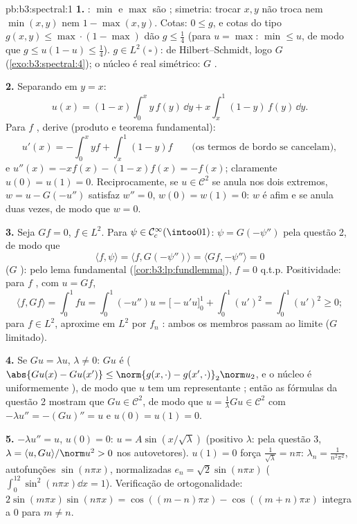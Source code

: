 \begin{solution}{pb:b3:spectral:1}
\textbf{1.} : $\min$ e $\max$ são ;
simetria: trocar $x, y$ não troca nem $\min(x,y)$ nem $1 -
\max(x,y)$. Cotas: $0 \leq g$, e cotas do tipo $g(x,y) \leq
\max\cdot(1-\max)$ dão $g \leq \frac14$ (para $u
= \max$: $\min \leq u$, de modo que $g \leq u(1-u) \leq \frac14$). $g
\in L^2(\square)$: de Hilbert--Schmidt, logo $G$ 
(\cref{exo:b3:spectral:4}); o núcleo é real simétrico: $G$
.

\textbf{2.} Separando em $y = x$:
\[
u(x) = (1 - x)\int_0^x y\,f(y)\,\dd y +
x\int_x^1(1 - y)\,f(y)\,\dd y .
\]
Para $f$ , derive (produto e teorema
fundamental):
\[
u'(x) = -\int_0^xyf + \int_x^1(1-y)f
\qquad\text{(os termos de bordo se cancelam)},
\]
e $u''(x) = -xf(x) - (1 - x)f(x) = -f(x)$; claramente $u(0) =
u(1) = 0$. Reciprocamente, se $u \in \mathcal C^2$ se anula nos dois
extremos, $w = u - G(-u'')$ satisfaz $w'' = 0$, $w(0) = w(1) =
0$: $w$ é afim e se anula duas vezes, de modo que $w = 0$.

\textbf{3.} Seja $Gf = 0$, $f \in L^2$. Para $\psi \in \mathcal
C_c^\infty(\intoo01)$: $\psi = G(-\psi'')$ pela questão 2, de modo que
\[
\langle f, \psi\rangle = \langle f, G(-\psi'')\rangle
= \langle Gf, -\psi''\rangle = 0
\]
($G$ ): pelo lema fundamental
(\cref{cor:b3:lp:fundlemma}), $f = 0$ q.t.p. Positividade: para
$f$ , com $u = Gf$,
\[
\langle f, Gf\rangle = \int_0^1 fu = \int_0^1(-u'')u
= \bigl[-u'u\bigr]_0^1 + \int_0^1(u')^2 = \int_0^1(u')^2
\geq 0 ;
\]
para $f \in L^2$, aproxime em $L^2$ por $f_n$ :
ambos os membros passam ao limite ($G$ limitado).

\textbf{4.} Se $Gu = \lambda u$, $\lambda \neq 0$: $Gu$ é
 ($\abs{Gu(x) - Gu(x')} \leq \norm{g(x,\cdot) -
g(x',\cdot)}_2\norm u_2$, e o núcleo é uniformemente
), de modo que $u$ tem um representante ; então
as fórmulas da questão 2 mostram que $Gu \in \mathcal C^2$, de modo que $u =
\frac1\lambda Gu \in \mathcal C^2$ com $-\lambda u'' =
-(Gu)'' = u$ e $u(0) = u(1) = 0$.

\textbf{5.} $-\lambda u'' = u$, $u(0) = 0$: $u = A\sin(x/\sqrt
\lambda)$ (positivo $\lambda$: pela questão 3, $\lambda =
\langle u, Gu\rangle/\norm u^2 > 0$ nos autovetores). $u(1) =
0$ força $\frac1{\sqrt\lambda} = n\pi$: $\lambda_n =
\frac1{n^2\pi^2}$, autofunções $\sin(n\pi x)$, normalizadas
$e_n = \sqrt2\sin(n\pi x)$ ($\int_0^12\sin^2(n\pi x)\dd x =
1$). Verificação de ortogonalidade: $2\sin(m\pi x)\sin(n\pi x) =
\cos((m-n)\pi x) - \cos((m+n)\pi x)$ integra a $0$ para $m
\neq n$.


\end{solution}
